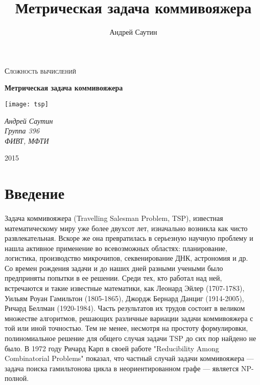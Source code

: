 \documentclass[a4paper]{article}
\title{Метрическая задача коммивояжера}
\author{Андрей Саутин}
\date{}
\begin{document}
\begin{titlepage}
    \centering
    {\scshape\Large Сложность вычислений \par}
    \vspace{1cm}
    {\huge\bfseries Метрическая задача коммивояжера\par}
    \vfill
    \texttt{[image: tsp]}\par\vspace{1cm}
    \vfill
    {\Large\itshape Андрей Саутин\\Группа 396\\ФИВТ, МФТИ\par}
    
    \vfill
    {\large 2015\par}
\end{titlepage}

\bigskip

\section{Введение}

\paragraph{} Задача коммивояжера (Travelling Salesman Problem, TSP), известная математическому миру уже более двухсот лет, изначально возникла как чисто развлекательная. Вскоре же она превратилась в серьезную научную проблему \cite{mudrov} и нашла активное применение во всевозможных областях: планирование, логистика, производство микрочипов, секвенирование ДНК, астрономия и др. \cite{wikien}\\

Со времен рождения задачи и до наших дней разными учеными было предприняты попытки в ее решении. Среди тех, кто работал над ней, встречаются и такие известные математики, как Леонард Эйлер (1707-1783), Уильям Роуан Гамильтон (1805-1865), Джордж Бернард Данциг (1914-2005), Ричард Беллман (1920-1984). Часть результатов их трудов состоит в великом множестве алгоритмов, решающих различные вариации задачи коммивояжера с той или иной точностью. \cite{mudrov} Тем не менее, несмотря на простоту формулировки, полиномиальное решение для общего случая задачи TSP до сих пор найдено не было. В 1972 году Ричард Карп в своей работе "Reducibility Among Combinatorial Problems"  показал, что частный случай задачи коммивояжера --- задача поиска гамильтонова цикла в неориентированном графе ---  является NP-полной. \cite{karp}\\
\end{document}

